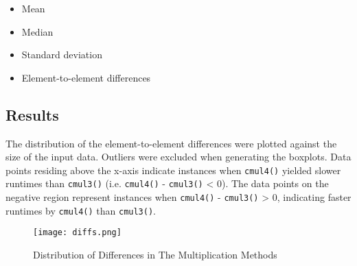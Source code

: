 \documentclass[usletter, 12pt]{article}
\begin{document}
        \begin{itemize}

            \item Mean
            \item Median
            \item Standard deviation
            \item Element-to-element differences

        \end{itemize}

        \subsection{Results}
        The distribution of the element-to-element differences were plotted against the size of the input data. Outliers were excluded when generating the boxplots. Data points residing above the x-axis indicate instances when \texttt{cmul4()} yielded slower runtimes than \texttt{cmul3()} (i.e. \texttt{cmul4()} - \texttt{cmul3()} < 0). The data points on the negative region represent instances when \texttt{cmul4()} - \texttt{cmul3()} > 0, indicating faster runtimes by \texttt{cmul4()} than \texttt{cmul3()}.

        \begin{figure}[ht]
            \begin{center}
                \texttt{[image: diffs.png]}
                \caption{Distribution of Differences in The Multiplication Methods} \label{diffs}
            \end{center}
        \end{figure}
\end{document}
